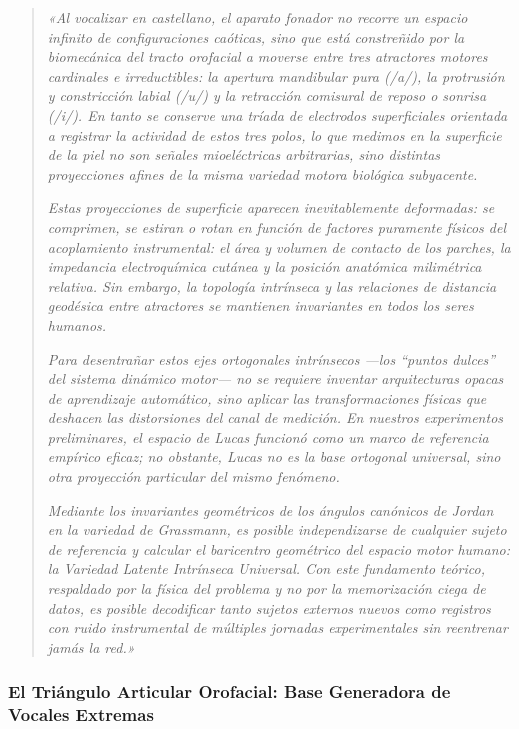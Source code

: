 \documentclass[11pt,a4paper,openany]{book}
\theoremstyle{definition}
\begin{document}
\begin{quote}
\small
\textit{«Al vocalizar en castellano, el aparato fonador no recorre un espacio infinito de configuraciones caóticas, sino que está constreñido por la biomecánica del tracto orofacial a moverse entre tres atractores motores cardinales e irreductibles: la apertura mandibular pura (/a/), la protrusión y constricción labial (/u/) y la retracción comisural de reposo o sonrisa (/i/). En tanto se conserve una tríada de electrodos superficiales orientada a registrar la actividad de estos tres polos, lo que medimos en la superficie de la piel no son señales mioeléctricas arbitrarias, sino distintas proyecciones afines de la misma variedad motora biológica subyacente.}

\textit{Estas proyecciones de superficie aparecen inevitablemente deformadas: se comprimen, se estiran o rotan en función de factores puramente físicos del acoplamiento instrumental: el área y volumen de contacto de los parches, la impedancia electroquímica cutánea y la posición anatómica milimétrica relativa. Sin embargo, la topología intrínseca y las relaciones de distancia geodésica entre atractores se mantienen invariantes en todos los seres humanos.}

\textit{Para desentrañar estos ejes ortogonales intrínsecos ---los ``puntos dulces'' del sistema dinámico motor--- no se requiere inventar arquitecturas opacas de aprendizaje automático, sino aplicar las transformaciones físicas que deshacen las distorsiones del canal de medición. En nuestros experimentos preliminares, el espacio de Lucas funcionó como un marco de referencia empírico eficaz; no obstante, Lucas no es la base ortogonal universal, sino otra proyección particular del mismo fenómeno.}

\textit{Mediante los invariantes geométricos de los ángulos canónicos de Jordan en la variedad de Grassmann, es posible independizarse de cualquier sujeto de referencia y calcular el baricentro geométrico del espacio motor humano: la Variedad Latente Intrínseca Universal. Con este fundamento teórico, respaldado por la física del problema y no por la memorización ciega de datos, es posible decodificar tanto sujetos externos nuevos como registros con ruido instrumental de múltiples jornadas experimentales sin reentrenar jamás la red.»}
\end{quote}

\subsubsection{El Triángulo Articular Orofacial: Base Generadora de Vocales Extremas}
\label{subsubsec:triangulo_articular_orofacial}
\end{document}

